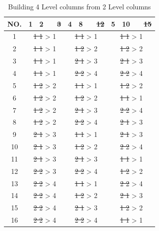 \begin{table}[ht]
	\centering
	\begin{tabular}{ |c||cccc|cccc|cccc|  }
		\hline
		NO.& 1 & 2 & & \sout{3} & 4 & 8 & &  \sout{12} & 5 & 10 & &  \sout{15}\\
		\hline
		1  & \multicolumn{4}{c}{\sout{1 1} > 1 } & \multicolumn{4}{|c|}{\sout{1 1} > 1 } & \multicolumn{4}{c|}{\sout{1 1} > 1 }\\
		2  & \multicolumn{4}{c}{\sout{1 1} > 1 } & \multicolumn{4}{|c|}{\sout{1 2} > 2 } & \multicolumn{4}{c|}{\sout{1 2} > 2 }\\
		3  & \multicolumn{4}{c}{\sout{1 1} > 1 } & \multicolumn{4}{|c|}{\sout{2 1} > 3 } & \multicolumn{4}{c|}{\sout{2 1} > 3 }\\
		4  & \multicolumn{4}{c}{\sout{1 1} > 1 } & \multicolumn{4}{|c|}{\sout{2 2} > 4 } & \multicolumn{4}{c|}{\sout{2 2} > 4 }\\
		5  & \multicolumn{4}{c}{\sout{1 2} > 2 } & \multicolumn{4}{|c|}{\sout{1 1} > 1 } & \multicolumn{4}{c|}{\sout{1 2} > 2 }\\
		6  & \multicolumn{4}{c}{\sout{1 2} > 2 } & \multicolumn{4}{|c|}{\sout{1 2} > 2 } & \multicolumn{4}{c|}{\sout{1 1} > 1 }\\
		7  & \multicolumn{4}{c}{\sout{1 2} > 2 } & \multicolumn{4}{|c|}{\sout{2 1} > 3 } & \multicolumn{4}{c|}{\sout{2 2} > 4 }\\
		8  & \multicolumn{4}{c}{\sout{1 2} > 2 } & \multicolumn{4}{|c|}{\sout{2 2} > 4 } & \multicolumn{4}{c|}{\sout{2 1} > 3 }\\
		9  & \multicolumn{4}{c}{\sout{2 1} > 3 } & \multicolumn{4}{|c|}{\sout{1 1} > 1 } & \multicolumn{4}{c|}{\sout{2 1} > 3 }\\
		10 & \multicolumn{4}{c}{\sout{2 1} > 3 } & \multicolumn{4}{|c|}{\sout{1 2} > 2 } & \multicolumn{4}{c|}{\sout{2 2} > 4 }\\
		11 & \multicolumn{4}{c}{\sout{2 1} > 3 } & \multicolumn{4}{|c|}{\sout{2 1} > 3 } & \multicolumn{4}{c|}{\sout{1 1} > 1 }\\
		12 & \multicolumn{4}{c}{\sout{2 2} > 3 } & \multicolumn{4}{|c|}{\sout{2 2} > 4 } & \multicolumn{4}{c|}{\sout{1 2} > 2 }\\
		13 & \multicolumn{4}{c}{\sout{2 2} > 4 } & \multicolumn{4}{|c|}{\sout{1 1} > 1 } & \multicolumn{4}{c|}{\sout{2 2} > 4 }\\
		14 & \multicolumn{4}{c}{\sout{2 2} > 4 } & \multicolumn{4}{|c|}{\sout{1 2} > 2 } & \multicolumn{4}{c|}{\sout{2 1} > 3 }\\
		15 & \multicolumn{4}{c}{\sout{2 2} > 4 } & \multicolumn{4}{|c|}{\sout{2 1} > 3 } & \multicolumn{4}{c|}{\sout{1 2} > 2 }\\
		16 & \multicolumn{4}{c}{\sout{2 2} > 4 } & \multicolumn{4}{|c|}{\sout{2 2} > 4 } & \multicolumn{4}{c|}{\sout{1 1} > 1 }\\
		\hline
	\end{tabular}
	\caption{Building 4 Level columns from 2 Level columns}
	\label{table:hyperparameter_tuning:merging_columns}
\end{table}


